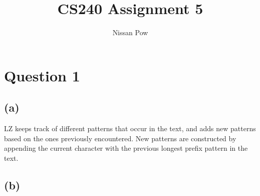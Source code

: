 \documentclass{article}[12pt]
\title{CS240 Assignment 5}
\author{Nissan Pow}
\begin{document}
\maketitle

\section*{Question 1}
\subsection*{(a)}
LZ keeps track of different patterns that occur in the text, and adds new patterns based
on the ones previously encountered. New patterns are constructed by appending the current
character with the previous longest prefix pattern in the text.

\newpage

\subsection*{(b)}
\end{document}
